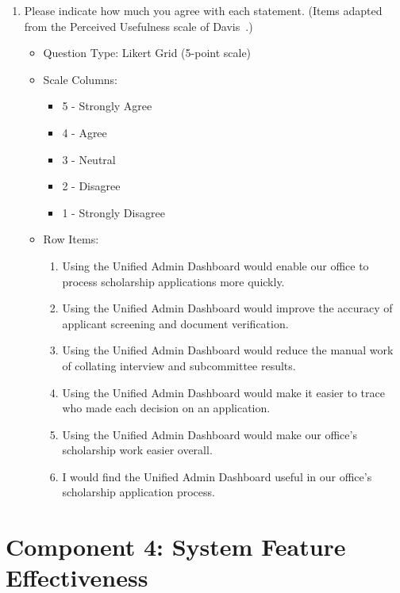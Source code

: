 \begin{enumerate}[resume=q, label={Question \arabic*:}, leftmargin=*, align=left]
  \item Please indicate how much you agree with each statement. (Items adapted from the Perceived Usefulness scale of Davis~\cite{ref51}.)
  \begin{itemize}[leftmargin=*]
    \item Question Type: Likert Grid (5-point scale)
    \item Scale Columns:
    \begin{itemize}[leftmargin=*]
      \item 5 - Strongly Agree
      \item 4 - Agree
      \item 3 - Neutral
      \item 2 - Disagree
      \item 1 - Strongly Disagree
    \end{itemize}
    \item Row Items:
    \begin{enumerate}[label=\arabic*., leftmargin=*]
      \item Using the Unified Admin Dashboard would enable our office to process scholarship applications more quickly.
      \item Using the Unified Admin Dashboard would improve the accuracy of applicant screening and document verification.
      \item Using the Unified Admin Dashboard would reduce the manual work of collating interview and subcommittee results.
      \item Using the Unified Admin Dashboard would make it easier to trace who made each decision on an application.
      \item Using the Unified Admin Dashboard would make our office's scholarship work easier overall.
      \item I would find the Unified Admin Dashboard useful in our office's scholarship application process.
    \end{enumerate}
  \end{itemize}
\end{enumerate}

\section{Component 4: System Feature Effectiveness}


